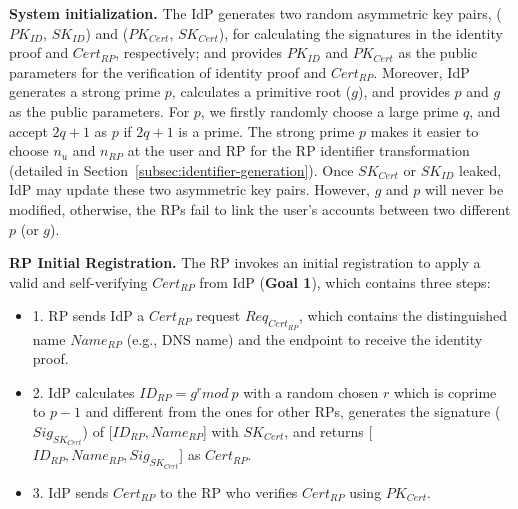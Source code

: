 \textbf{System initialization.} The IdP generates two random asymmetric key pairs, ($PK_{ID}$, $SK_{ID}$) and ($PK_{Cert}$, $SK_{Cert}$),
for calculating the signatures in the identity proof and $Cert_{RP}$, respectively;
and provides $PK_{ID}$ and $PK_{Cert}$ as the public parameters for the verification of identity proof and $Cert_{RP}$.
Moreover, IdP generates a strong prime $p$, calculates  a primitive root ($g$), and provides $p$ and $g$ as the public parameters.
For $p$, we firstly randomly choose a large prime $q$, and accept  $2q+1$ as $p$ if $2q+1$ is a prime.
The strong prime $p$ makes it easier to choose $n_{u}$ and $n_{RP}$ at the user and RP for the RP identifier transformation (detailed in  Section~\ref{subsec:identifier-generation}). %
Once $SK_{Cert}$ or $SK_{ID}$ leaked, IdP may update these two asymmetric key pairs.
However, $g$ and $p$ will never be modified, otherwise, the RPs fail to link the user's accounts between two different $p$ (or $g$).



\noindent\textbf{RP Initial Registration.}
The RP invokes an initial registration to apply a valid and self-verifying $Cert_{RP}$ from IdP (\textbf{Goal 1}),
 which contains three steps:

\begin{itemize}
\item 1. RP sends IdP a $Cert_{RP}$ request $Req_{Cert_{RP}}$, which contains the distinguished name $Name_{RP}$ (e.g., DNS name) and the endpoint to receive the identity proof.
\item 2. IdP calculates $ID_{RP} = g^r mod \ p$ with a random chosen $r$ which is coprime to $p-1$ and different from the ones for other RPs,  generates the signature ($Sig_{SK_{Cert}}$) of [$ID_{RP}, Name_{RP}$] with $SK_{Cert}$, and returns [$ID_{RP}, Name_{RP}, Sig_{SK_{Cert}}$] as $Cert_{RP}$.
\item 3. IdP sends $Cert_{RP}$ to the RP who verifies $Cert_{RP}$ using $PK_{Cert}$.
\end{itemize}


